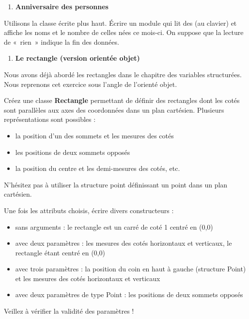 \liststyleExercice
\begin{enumerate}
\item {\sffamily\bfseries
Anniversaire des personnes}
\end{enumerate}
{
Utilisons la classe  écrite plus haut.
Écrire un module qui lit des  (au clavier)
et affiche les noms et le nombre de celles nées ce mois-ci. On suppose
que la lecture de «~rien~» indique la fin des données.}

\liststyleExercice
\setcounter{saveenum}{\value{enumi}}
\begin{enumerate}
\setcounter{enumi}{\value{saveenum}}
\item {\sffamily\bfseries
Le rectangle (version orientée objet)}
\end{enumerate}
{
Nous avons déjà abordé les rectangles dans le chapitre des variables
structurées. Nous reprenons cet exercice sous l’angle de l’orienté
objet.}

{
{Créez une classe
}{\textbf{Rectangle}}{
permettant de définir des rectangles dont les cotés sont parallèles aux
axes des coordonnées dans un plan cartésien. Plusieurs représentations
sont possibles : }}

\liststyleListi
\begin{itemize}
\item {
la position d’un des sommets et les mesures des cotés}
\item {
les positions de deux sommets opposés}
\item {
la position du centre et les demi-mesures des cotés, etc.}
\end{itemize}
{
N’hésitez pas à utiliser la structure point définissant un point dans un
plan cartésien.}

{
Une fois les attributs choisis, écrire divers constructeurs :}

\liststyleListi
\begin{itemize}
\item {
sans arguments : le rectangle est un carré de coté 1 centré en (0,0)}
\item {
avec deux paramètres : les mesures des cotés horizontaux et verticaux,
le rectangle étant centré en (0,0)}
\item {
avec trois paramètres : la position du coin en haut à gauche (structure
Point) et les mesures des cotés horizontaux et verticaux }
\item {
avec deux paramètres de type Point : les positions de deux sommets
opposés}
\end{itemize}
{
Veillez à vérifier la validité des paramètres !}

